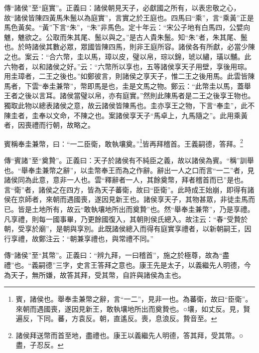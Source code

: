 {\noindent\zhuan{}\fzbyks 傳“諸侯”至“庭實”。正義曰：諸侯朝見天子，必獻國之所有，以表忠敬之心，故“諸侯皆陳四黃馬朱鬛以為庭實”，言實之於王庭也。四馬曰“乘”，言“乘黃”正是馬色黃矣。“黃”下言“朱”，“朱”非馬色。定十年云：“宋公子地有白馬四，公嬖向魋，魋欲之。公取而朱其尾、鬛以與之。”是古人貴朱鬛。知“朱”者，朱其尾、鬛也。於時諸侯其數必眾，眾國皆陳四馬，則非王庭所容。諸侯各有所獻，必當少陳之也。案云：“合六幣，圭以馬，璋以皮，璧以帛，琮以錦，琥以繡，璜以黼。此六物者，以和諸侯之好。”云：“六幣所以享也，五等諸侯享天子用壁，享後用琮。用圭璋者，二王之後也。”如鄭彼言，則諸侯之享天子，惟二王之後用馬。此雲皆陳馬者，下雲“奉圭兼幣”，幣即馬是也，圭是文馬之物。鄭云：“此幣圭以馬，蓋舉王者之後以言耳。諸侯當璧以帛，亦有庭實。”然則此陳馬者是二王之後享王物也。獨取此物以總表諸侯之意，故云諸侯皆陳馬也。圭亦享王之物，下言“奉圭”，此不陳圭者，圭奉以文命，不陳之也。案諸侯享天子“馬卓上，九馬隨之”。此用乘黃者，因喪禮而行朝，故略之。 \par}

賓稱奉圭兼幣，曰：“一二臣衛，敢執壤奠。”\footnote{賓，諸侯也。舉奉圭兼幣之辭，言“一二”，見非一也。為蕃衛，故曰“臣衛”。來朝而遇國喪，遂因見新王，敢執壤地所出而奠贄也。○壤，如丈反。見，賢遍反，下同。蕃，方袁反。朝，直遙反。喪，息浪反。贄音至。}皆再拜稽首。王義嗣德，答拜。\footnote{諸侯拜送幣而首至地，盡禮也。康王以義繼先人明德，答其拜，受其幣。○盡，子忍反。}

{\noindent\zhuan{}\fzbyks 傳“賓諸”至“奠贄”。正義曰：天子於諸侯有不純臣之義，故以諸侯為賓。“稱”訓舉也。“舉奉圭兼幣之辭”，以圭幣奉王而為之作辭。辭出一人之口而言“一二”者，見諸侯同為此意，意非一人也。雲“釋辭者一人，其餘奠幣，拜者稽首而已”是也。言“衛”者，諸侯之在四方，皆為天子蕃衛，故曰“臣衛”。此時成王始崩，即得有諸侯在京師者，來朝而遇國喪，遂因見新王也。諸侯享天子，其物甚眾，非徒圭馬而已。皆是土地所有，故云“敢執壤地所出而奠贄”也。然“舉奉圭兼幣”，乃是享禮。凡享禮，則每一國事畢，乃更餘國復入，其朝則侯氏總入。故注云：“春“受贄於朝，受享於廟”，是朝與享別。此既諸侯總入而得有庭實享禮者，以新朝嗣王，因行享禮，故鄭注云：“朝兼享禮也，與常禮不同。” \par}

{\noindent\zhuan{}\fzbyks 傳“諸侯”至“其幣”。正義曰：“辨九拜，一曰稽首”，施之於極尊，故為“盡禮”也。“義嗣德”三字，史言王答拜之意也。康王先是太子，以義繼先人明德，今為天子，無所嫌，故答其拜，受其幣，自許與諸侯為主也。 \par}

